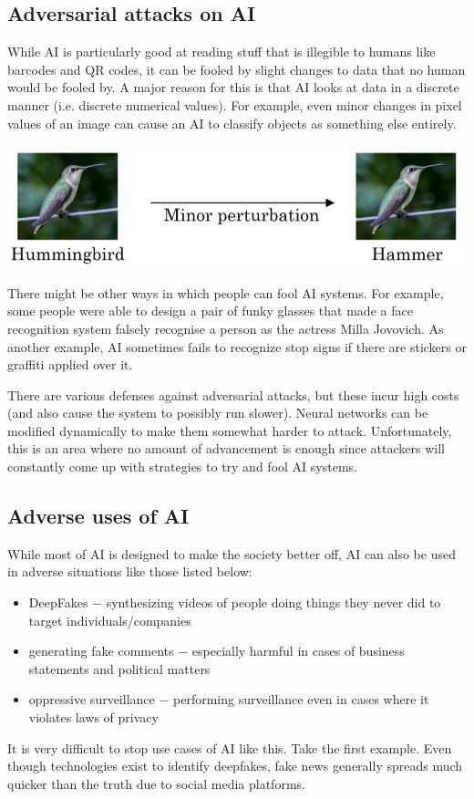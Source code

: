 \documentclass{article}[a4paper,12pt]
\theoremstyle{definition}
\begin{document}
\subsection{Adversarial attacks on AI}
While AI is particularly good at reading stuff that is illegible to humans like barcodes and QR codes, it can be fooled by slight changes to data that no human would be fooled by. A major reason for this is that AI looks at data in a discrete manner (i.e. discrete numerical values). For example, even minor changes in pixel values of an image can cause an AI to classify objects as something else entirely.
\begin{center}\includegraphics[scale=0.6]{adversarial_attacks.png}\end{center}
There might be other ways in which people can fool AI systems. For example, some people were able to design a pair of funky glasses that made a face recognition system falsely recognise a person as the actress Milla Jovovich. As another example, AI sometimes fails to recognize stop signs if there are stickers or graffiti applied over it.
\vspace{6pt}

There are various defenses against adversarial attacks, but these incur high costs (and also cause the system to possibly run slower). Neural networks can be modified dynamically to make them somewhat harder to attack. Unfortunately, this is an area where no amount of advancement is enough since attackers will constantly come up with strategies to try and fool AI systems.
\subsection{Adverse uses of AI}
While most of AI is designed to make the society better off, AI can also be used in adverse situations like those listed below:
\begin{itemize}
	\item DeepFakes $-$ synthesizing videos of people doing things they never did to target individuals/companies
	\item generating fake comments $-$ especially harmful in cases of business statements and political matters 
	\item oppressive surveillance $-$ performing surveillance even in cases where it violates laws of privacy
\end{itemize}
It is very difficult to stop use cases of AI like this. Take the first example. Even though technologies exist to identify deepfakes, fake news generally spreads much quicker than the truth due to social media platforms.
\end{document}
